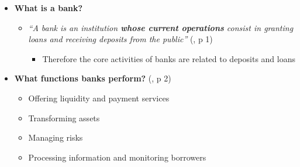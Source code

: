 \documentclass[
  ignorenonframetext,
]{beamer}
\providecommand{\tightlist}{%
  \setlength{\itemsep}{0pt}\setlength{\parskip}{0pt}}\usepackage{longtable,booktabs,array}
\begin{document}
\begin{frame}{}
\label{section-15}
\begin{itemize}
\item
  \textbf{What is a bank?}

  \begin{itemize}
  \item
    \emph{``A bank is an institution \textbf{whose current operations}
    consist in granting loans and receiving deposits from the public''}
    (, p 1)

    \begin{itemize}
    \tightlist
    \item
      Therefore the core activities of banks are related to deposits and
      loans
    \end{itemize}
  \end{itemize}
\item
  \textbf{What functions banks perform?}
  (,
  p 2)

  \begin{itemize}
  \tightlist
  \item
    Offering liquidity and payment services
  \item
    Transforming assets
  \item
    Managing risks
  \item
    Processing information and monitoring borrowers
  \end{itemize}
\end{itemize}
\end{frame}
\end{document}
